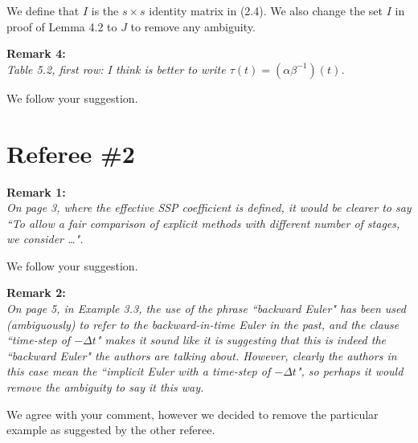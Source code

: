 \documentclass[12pt]{article}
\newcommand{\remark}[2]{\vspace{25pt} \noindent \textbf{Remark #1:\newline} \textit{#2}\vspace{15pt}}
\renewcommand{\newline}{\vspace{15pt}\\}
\begin{document}
We define that $I$ is the $s \times s$ identity matrix in (2.4).
We also change the set $I$ in proof of Lemma 4.2 to $J$ to remove any ambiguity.

\remark{4}{
Table 5.2, first row: I think is better to write $\tau(t) = (\alpha\beta^{-1})(t)$.}

We follow your suggestion.
\vspace{50pt}

\section*{Referee \#2}
\remark{1}{
On page 3, where the effective SSP coefficient is defined, it would be clearer to say
``To allow a fair comparison of explicit methods with different number of stages, we consider \dots". }

We follow your suggestion.

\remark{2}{
On page 5, in Example 3.3, the use of the phrase ``backward Euler" has been used 
(ambiguously) to refer to the backward-in-time Euler in the past, and the clause 
``time-step of $-\Delta t$" makes it sound like it is suggesting that this is indeed 
the ``backward Euler" the authors are talking about. 
However, clearly the authors in this case mean the ``implicit Euler with a time-step 
of $-\Delta t$", so perhaps it would remove the ambiguity to say it this way.}

We agree with your comment, however we decided to remove the particular example 
as suggested by the other referee.
\end{document}

